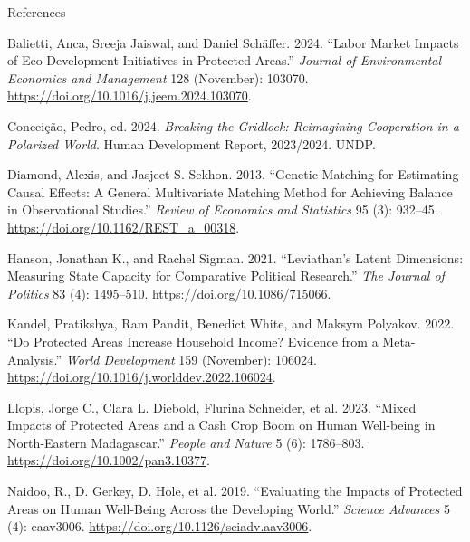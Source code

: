 \documentclass[
  ignorenonframetext,
  aspectratio=169,
]{beamer}
\newlength{\cslhangindent}
\newenvironment{CSLReferences}[2] %
 {\begin{list}{}{%
  \setlength{\itemindent}{0pt}
  \setlength{\leftmargin}{0pt}
  \setlength{\parsep}{0pt}
  \ifodd #1
   \setlength{\leftmargin}{\cslhangindent}
   \setlength{\itemindent}{-1\cslhangindent}
  \fi
  \setlength{\itemsep}{#2\baselineskip}}}
 {\end{list}}
\begin{document}
\begin{frame}[allowframebreaks]{References}
\protect{}\label{references}
\footnotesize

\protect{}\label{refs}
\begin{CSLReferences}{1}{1}
Balietti, Anca, Sreeja Jaiswal, and Daniel Schäffer. 2024. {``Labor
Market Impacts of Eco-Development Initiatives in Protected Areas.''}
\emph{Journal of Environmental Economics and Management} 128 (November):
103070. \url{https://doi.org/10.1016/j.jeem.2024.103070}.

Conceição, Pedro, ed. 2024. \emph{Breaking the Gridlock: {Reimagining}
Cooperation in a {Polarized} World}. Human {Development} {Report},
2023/2024. UNDP.

Diamond, Alexis, and Jasjeet S. Sekhon. 2013. {``Genetic {Matching} for
{Estimating} {Causal} {Effects}: {A} {General} {Multivariate} {Matching}
{Method} for {Achieving} {Balance} in {Observational} {Studies}.''}
\emph{Review of Economics and Statistics} 95 (3): 932--45.
\url{https://doi.org/10.1162/REST_a_00318}.

Hanson, Jonathan K., and Rachel Sigman. 2021. {``Leviathan's {Latent}
{Dimensions}: {Measuring} {State} {Capacity} for {Comparative}
{Political} {Research}.''} \emph{The Journal of Politics} 83 (4):
1495--510. \url{https://doi.org/10.1086/715066}.

Kandel, Pratikshya, Ram Pandit, Benedict White, and Maksym Polyakov.
2022. {``Do Protected Areas Increase Household Income? {Evidence} from a
{Meta}-{Analysis}.''} \emph{World Development} 159 (November): 106024.
\url{https://doi.org/10.1016/j.worlddev.2022.106024}.

Llopis, Jorge C., Clara L. Diebold, Flurina Schneider, et al. 2023.
{``Mixed Impacts of Protected Areas and a Cash Crop Boom on Human
Well‐being in {North}‐{Eastern} {Madagascar}.''} \emph{People and
Nature} 5 (6): 1786--803. \url{https://doi.org/10.1002/pan3.10377}.

Naidoo, R., D. Gerkey, D. Hole, et al. 2019. {``Evaluating the Impacts
of Protected Areas on Human Well-Being Across the Developing World.''}
\emph{Science Advances} 5 (4): eaav3006.
\url{https://doi.org/10.1126/sciadv.aav3006}.


\end{CSLReferences}
\end{frame}
\end{document}
